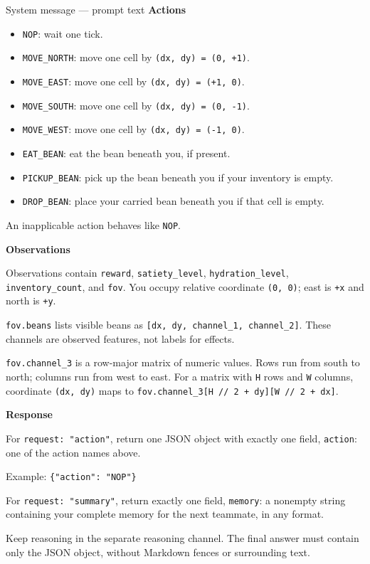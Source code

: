 \begin{pilotmessage}[breakable]{System message --- prompt text}
    \noindent\textbf{Actions}\par
    \begin{itemize}
        \item \verb|NOP|: wait one tick.
        \item \verb|MOVE_NORTH|: move one cell by \verb|(dx, dy) = (0, +1)|.
        \item \verb|MOVE_EAST|: move one cell by \verb|(dx, dy) = (+1, 0)|.
        \item \verb|MOVE_SOUTH|: move one cell by \verb|(dx, dy) = (0, -1)|.
        \item \verb|MOVE_WEST|: move one cell by \verb|(dx, dy) = (-1, 0)|.
        \item \verb|EAT_BEAN|: eat the bean beneath you, if present.
        \item \verb|PICKUP_BEAN|: pick up the bean beneath you if your inventory is empty.
        \item \verb|DROP_BEAN|: place your carried bean beneath you if that cell is empty.
    \end{itemize}
    An inapplicable action behaves like \verb|NOP|.

    \noindent\textbf{Observations}\par
    Observations contain \verb|reward|, \verb|satiety_level|, \verb|hydration_level|, \verb|inventory_count|, and \verb|fov|.
    You occupy relative coordinate \verb|(0, 0)|; east is \verb|+x| and north is \verb|+y|.

    \verb|fov.beans| lists visible beans as \verb|[dx, dy, channel_1, channel_2]|.
    These channels are observed features, not labels for effects.

    \verb|fov.channel_3| is a row-major matrix of numeric values.
    Rows run from south to north; columns run from west to east.
    For a matrix with \verb|H| rows and \verb|W| columns, coordinate \verb|(dx, dy)| maps to \texttt{fov.channel\_3[H // 2 + dy][W // 2 + dx]}.

    \noindent\textbf{Response}\par
    For \verb|request: "action"|, return one JSON object with exactly one field, \verb|action|: one of the action names above.

    Example: \verb|{"action": "NOP"}|

    For \verb|request: "summary"|, return exactly one field, \verb|memory|: a nonempty string containing your complete memory for the next teammate, in any format.

    Keep reasoning in the separate reasoning channel.
    The final answer must contain only the JSON object, without Markdown fences or surrounding text.
\end{pilotmessage}


